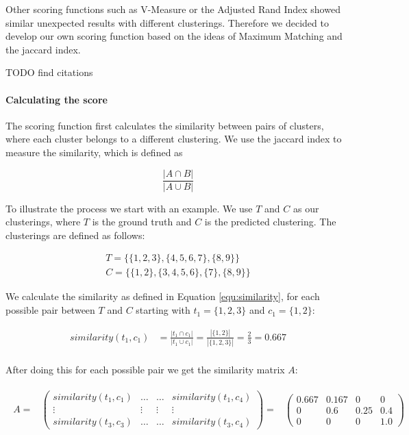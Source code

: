 Other scoring functions such as V-Measure or the Adjusted Rand Index showed similar unexpected results with different clusterings. Therefore we decided to develop our own scoring function based on the ideas of Maximum Matching and the jaccard index.

TODO find citations

\paragraph{Calculating the score}

The scoring function first calculates the similarity between pairs of clusters, where each cluster belongs to a different clustering. We use the jaccard index to measure the similarity, which is defined as

\begin{equation}
    \label{equ:similarity}
    \frac{|A \cap B|}{|A \cup B|}
\end{equation}

To illustrate the process we start with an example. We use $T$ and $C$ as our clusterings, where $T$ is the ground truth and $C$ is the predicted clustering. The clusterings are defined as follows:

\begin{gather*}
    T = \{\{1,2,3\},\{4,5,6,7\},\{8,9\}\} \\
    C = \{\{1,2\},\{3,4,5,6\},\{7\},\{8,9\}\}
\end{gather*}

We calculate the similarity as defined in Equation \ref{equ:similarity}, for each possible pair between $T$ and $C$ starting with $t_1= \{1,2,3\}$ and $c_1 = \{1,2\}$:

\begin{align*}
    similarity(t_1,c_1) &=\frac{|t_1 \cap c_1|}{|t_1 \cup c_1|}
    = \frac{|\{1,2\}|}{|\{1,2,3\}|}
    = \frac{2}{3} = 0.667 \\
\end{align*}

After doing this for each possible pair we get the similarity matrix $A$:

\begin{gather*}
\begin{array}{rcl}
    A = & \left(\begin{array}{cccc}
        similarity(t_1,c_1) & \hdots & \hdots & similarity(t_1,c_4)\\
        \vdots & \vdots & \vdots & \vdots\\
        similarity(t_3,c_3) & \hdots & \hdots & similarity(t_3,c_4) \end{array}\right)
        = & \left(\begin{array}{cccc}
            0.667 & 0.167 & 0 & 0 \\
            0 & 0.6 & 0.25 & 0.4 \\
            0 &  0 & 0 & 1.0 \end{array}\right)
\end{array}
\end{gather*}

